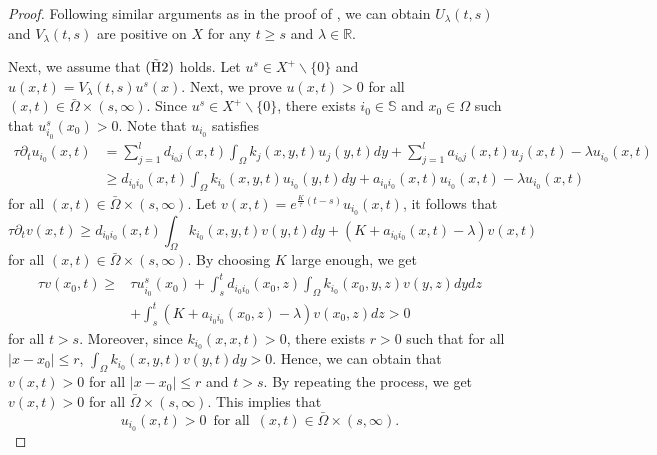 \documentclass[11pt,reqno]{amsart}
\numberwithin{equation}{section}
\begin{document}
\begin{proof}
Following similar arguments as in the proof of \cite[Proposition 2.1]{SZ}, we can obtain $U_{\lambda}(t,s)$ and $V_{\lambda}(t,s)$ are positive on $X$ for any $t\geq s$ and $\lambda\in\mathbb{R}$.

Next, we assume that ${ \rm (\tilde{H}2) }$ holds.
Let $u^{s}\in X^{+}\backslash \{ 0\}$ and $u(x,t) = V_{\lambda}(t,s)u^{s}(x)$.
Next, we prove $u(x,t)>0$ for all $(x,t)\in\bar{\Omega}\times (s,\infty)$.
Since $u^{s} \in X^{+}\backslash \{ 0\}$, there exists $i_{0} \in \mathbb{S}$ and $x_{0}\in\Omega$ such that $u^{s}_{i_{0}}(x_{0})>0$.
Note that $u_{i_{0}}$ satisfies
\begin{align*}
\tau \partial_{t} u_{i_{0}}(x,t) &=
\sum_{j=1}^{l} d_{i_{0}j}(x,t)\int_{\Omega}k_{j}(x,y,t)u_{j}(y,t)dy + \sum_{j=1}^{l}a_{i_{0}j}(x,t)u_{j}(x,t) - \lambda u_{i_{0}}(x,t) \\
&\geq
d_{i_{0}i_{0}}(x,t)\int_{\Omega}k_{i_{0}}(x,y,t)u_{i_{0}}(y,t)dy + a_{i_{0}i_{0}}(x,t)u_{i_{0}}(x,t) - \lambda u_{i_{0}}(x,t)
\end{align*}
for all $(x,t)\in\bar{\Omega}\times (s,\infty)$.
Let
$v(x,t) = e^{\frac{K}{\tau}(t-s)} u_{i_{0}}(x,t)$, it follows that
%
\begin{equation*}
\tau \partial_{t} v(x,t) \geq d_{i_{0}i_{0}}(x,t) \int_{\Omega} k_{i_{0}}(x,y,t)v(y,t)dy + (K + a_{i_{0}i_{0}}(x,t) - \lambda) v(x,t)
\end{equation*}
for all $(x,t)\in\bar{\Omega}\times (s,\infty)$.
By choosing $K$ large enough, we get
\begin{align*}
\tau v(x_{0},t) \geq &\tau u_{i_{0}}^{s}(x_{0}) + \int_{s}^{t} d_{i_{0}i_{0}}(x_{0},z)\int_{\Omega}k_{i_{0}}(x_{0},y,z)v(y,z)dydz \\
&+ \int_{s}^{t} (K + a_{i_{0}i_{0}}(x_{0},z) - \lambda) v(x_{0},z) dz > 0
\end{align*}
for all $t>s$. Moreover, since $k_{i_{0}}(x,x,t)>0$, there exists $r>0$ such that for all $|x-x_{0}|\leq r$,
$\int_{\Omega}k_{i_{0}}(x,y,t)v(y,t)dy>0$.
Hence, we can obtain that $v(x,t)>0$ for all $|x-x_{0}|\leq r$ and $t>s$.
By repeating the process, we get $v(x,t)>0$ for all $\bar{\Omega}\times (s,\infty)$. This implies that
\begin{equation*}
u_{i_{0}}(x,t)>0
\enspace \text{for all} \enspace (x,t)\in\bar{\Omega}\times (s,\infty).
\end{equation*}


\end{proof}
\end{document}

